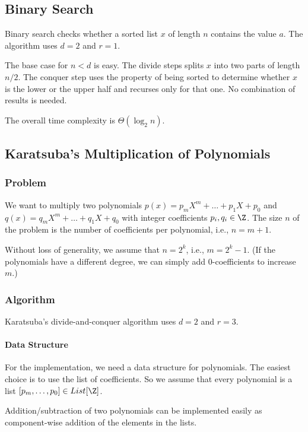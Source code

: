 \subsection{Binary Search}

Binary search checks whether a sorted list $x$ of length $n$ contains the value $a$.
The algorithm uses $d=2$ and $r=1$.

The base case for $n<d$ is easy.
The divide steps splits $x$ into two parts of length $n/2$.
The conquer step uses the property of being sorted to determine whether $x$ is the lower or the upper half and recurses only for that one.
No combination of results is needed.

The overall time complexity is $\Theta(\log_2 n)$.

\subsection{Karatsuba's Multiplication of Polynomials}

\subsubsection{Problem}

We want to multiply two polynomials $p(x)=p_mX^m+\ldots+p_1X+p_0$ and $q(x)=q_mX^m+\ldots+q_1X+q_0$ with integer coefficients $p_i,q_i\in \Z$.
The size $n$ of the problem is the number of coefficients per polynomial, i.e., $n=m+1$.

Without loss of generality, we assume that $n=2^k$, i.e., $m=2^k-1$.
(If the polynomials have a different degree, we can simply add $0$-coefficients to increase $m$.)

\subsubsection{Algorithm}

Karatsuba's divide-and-conquer algorithm uses $d=2$ and $r=3$.

\paragraph{Data Structure}
For the implementation, we need a data structure for polynomials.
The easiest choice is to use the list of coefficients.
So we assume that every polynomial is a list $[p_m,\ldots,p_0]\in List[\Z]$.

Addition/subtraction of two polynomials can be implemented easily as component-wise addition of the elements in the lists.

